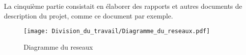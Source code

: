 La cinquième partie consistait en élaborer des rapports et autres documents de description du projet, comme ce document par exemple.

\begin{figure}[H]
	\begin{center}	
		\texttt{[image: Division\_du\_travail/Diagramme\_du\_reseaux.pdf]}
		\caption{Diagramme du reseaux}
		\label{fig:Diagramme_du_reseaux}
	\end{center}
\end{figure}
\newpage